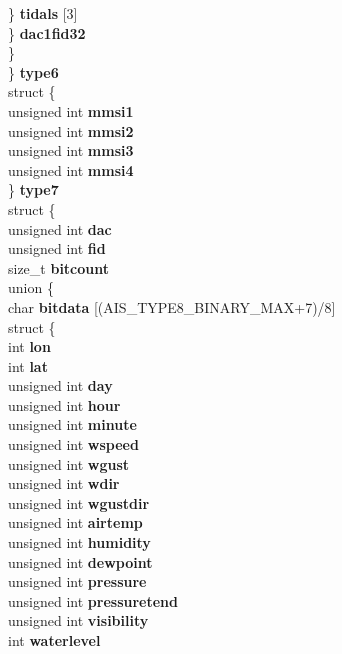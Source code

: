 \begin{DoxyCompactItemize}
{\begin{tabbing}
{\>\>\>\>\} {\bfseries tidals} \mbox{[}3\mbox{]}\\
\>\>\>\} {\bfseries dac1fid32}\\
\>\>\} }\label{structais__t_1_1@34_1_1@39_a2b3f42c4a663c1cf4bb37668a34c3c97}
\\
\>\} {\bfseries type6}\\
\>struct \{\\
\>\>unsigned int {\bfseries mmsi1}\\
\>\>unsigned int {\bfseries mmsi2}\\
\>\>unsigned int {\bfseries mmsi3}\\
\>\>unsigned int {\bfseries mmsi4}\\
\>\} {\bfseries type7}\\
\>struct \{\\
\>\>unsigned int {\bfseries dac}\\
\>\>unsigned int {\bfseries fid}\\
\>\>size\_t {\bfseries bitcount}\\
\hypertarget{structais__t_1_1@34_1_1@41_a95a8a21e0e94ba959b16eefdc959ab89}{\>\>union \{\\
\>\>\>char {\bfseries bitdata} \mbox{[}(AIS\_TYPE8\_BINARY\_MAX+7)/8\mbox{]}\\
\>\>\>struct \{\\
\>\>\>\>int {\bfseries lon}\\
\>\>\>\>int {\bfseries lat}\\
\>\>\>\>unsigned int {\bfseries day}\\
\>\>\>\>unsigned int {\bfseries hour}\\
\>\>\>\>unsigned int {\bfseries minute}\\
\>\>\>\>unsigned int {\bfseries wspeed}\\
\>\>\>\>unsigned int {\bfseries wgust}\\
\>\>\>\>unsigned int {\bfseries wdir}\\
\>\>\>\>unsigned int {\bfseries wgustdir}\\
\>\>\>\>unsigned int {\bfseries airtemp}\\
\>\>\>\>unsigned int {\bfseries humidity}\\
\>\>\>\>unsigned int {\bfseries dewpoint}\\
\>\>\>\>unsigned int {\bfseries pressure}\\
\>\>\>\>unsigned int {\bfseries pressuretend}\\
\>\>\>\>unsigned int {\bfseries visibility}\\
\>\>\>\>int {\bfseries waterlevel}\\
}
\end{tabbing}}
\end{DoxyCompactItemize}
